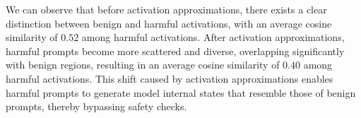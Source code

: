 We can observe that before activation approximations, there exists a clear distinction between benign and harmful activations, with an average cosine similarity of $0.52$ among harmful activations. After activation approximations, harmful prompts become more scattered and diverse, overlapping significantly with benign regions, resulting in an average cosine similarity of $0.40$ among harmful activations. This shift caused by activation approximations enables harmful prompts to generate model internal states that resemble those of benign prompts, thereby bypassing safety checks.







